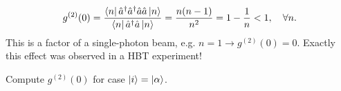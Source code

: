 \begin{testexample}[The second-order correlation function for Fock states ($\ket{i} = \ket{n}$).]
	\begin{equation}
		g^{(2)} (0) = \frac{\left\langle {n} \right\rvert \hat{a}^{\dagger} \hat{a}^{\dagger} \hat{a} \hat{a} \left\lvert {n} \right\rangle}{\left\langle {n} \right\rvert\hat{a}^{\dagger} \hat{a} \left\lvert {n} \right\rangle} = \frac{n(n-1)}{n^2} = 1 - \frac{1}{n} < 1, \quad \forall n.
	\end{equation}
	This is a factor of a single-photon beam, e.g. $n=1 \to g^{(2)}(0)=0$. Exactly this effect was observed in a HBT experiment!
\end{testexample}

\begin{hw}
	Compute $g^{(2)}(0)$ for case $\left\lvert {i} \right\rangle = \left\lvert {\alpha} \right\rangle$.
\end{hw} 